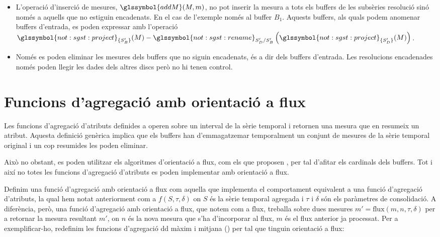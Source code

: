 \begin{example} 
  \begin{itemize}
  \item L'operació d'inserció de mesures, $\glssymbol{addM}(M,m)$, no
    pot inserir la mesura a tots els buffers de les subsèries
    resolució sinó només a aquells que no estiguin encadenats. En el
    cas de l'exemple només al buffer $B_1$.  Aquests buffers, als
    quals podem anomenar buffers d'entrada, es poden expressar amb
    l'operació $ \glssymbol{not:sgst:project}_{\{S'_B\}}(
    M ) -
    \glssymbol{not:sgst:rename}_{S'_D/S'_B}\left(
      \glssymbol{not:sgst:project}_{\{S'_D\}}( M)\right)$.


  \item Només es poden eliminar les mesures dels buffers que no siguin
    encadenats, és a dir dels buffers d'entrada. Les resolucions
    encadenades només poden llegir les dades dels altres discs però
    no hi tenen control.

  \end{itemize}







\end{example}









\section{Funcions d'agregació amb orientació a flux}


Les funcions d'agregació d'atributs definides a
 operen sobre un interval de la sèrie
temporal i retornen una mesura que en resumeix un atribut. Aquesta
definició genèrica implica que els buffers han d'emmagatzemar
temporalment un conjunt de mesures de la sèrie temporal original i un
cop resumides les poden eliminar.

Això no obstant, es poden utilitzar els algoritmes d'orientació a
flux, com els que proposen \textcite{cormode08:pods}, per tal d'afitar
els cardinals dels buffers. Tot i així no totes les funcions
d'agregació d'atributs es poden implementar amb orientació a flux.




Definim una funció d'agregació amb orientació a flux com aquella que
implementa el comportament equivalent a una funció d'agregació
d'atributs, la qual hem notat anteriorment com a $f(S,\tau,\delta)$ on
$S$ és la sèrie temporal agregada i $\tau$ i $\delta$ són els
paràmetres de consolidació. A diferència, però, una funció d'agregació
amb orientació a flux, que notem com a $\text{flux}$, treballa sobre
dues mesures $m'=\text{flux}(m,n,\tau,\delta)$ per a retornar la
mesura resultant $m'$, on $n$ és la nova mesura que s'ha d'incorporar
al flux, $m$ és el flux anterior ja processat.  Per a exemplificar-ho,
redefinim les funcions d'agregació \gls{dd} màxim i mitjana
() per tal que tinguin orientació a flux:

